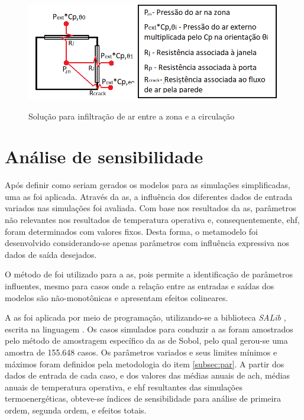 \documentclass[brazil,hardcopy,openany]{ufscthesis} %
\begin{document}
\begin{figure}[H]
	\centering
	\caption{Solução para infiltração de ar entre a zona e a circulação}
	\includegraphics[width=.8\linewidth]{img/AFN_crack2.png}
	\label{fig:AFN_crack}
\end{figure}

\section{Análise de sensibilidade}

Após definir como seriam gerados os modelos para as simulações simplificadas, uma \acrfull{as} foi aplicada. Através da \acrshort{as}, a influência dos diferentes dados de entrada variados nas simulações foi avaliada. Com base nos resultados da \acrshort{as}, parâmetros não relevantes nos resultados de temperatura operativa e, consequentemente, \acrfull{ehf}, foram determinados com valores fixos. Desta forma, o metamodelo foi desenvolvido considerando-se apenas parâmetros com influência expressiva nos dados de saída desejados.

O método de  \cite{Sobol1993} foi utilizado para a \acrshort{as}, pois permite a identificação de parâmetros influentes, mesmo para casos onde a relação entre as entradas e saídas dos modelos são não-monotônicas e apresentam efeitos colineares.

A \acrshort{as} foi aplicada por meio de programação, utilizando-se a biblioteca \textit{SALib} \cite{Herman2017}, escrita na linguagem .
Os casos simulados para conduzir a \acrshort{as} foram amostrados pelo método de amostragem específico da \acrshort{as} de Sobol, pelo qual gerou-se uma amostra de 155.648 casos.
Os parâmetros variados e seus limites mínimos e máximos foram definidos pela metodologia do item \ref{subsec:par}. 
A partir dos dados de entrada de cada caso, e dos valores das médias anuais de \acrshort{ach}, médias anuais de temperatura operativa, e \acrshort{ehf} resultantes das simulações termoenergéticas, obteve-se índices de sensibilidade para análise de primeira ordem, segunda ordem, e efeitos totais.
\newpage
\end{document}
